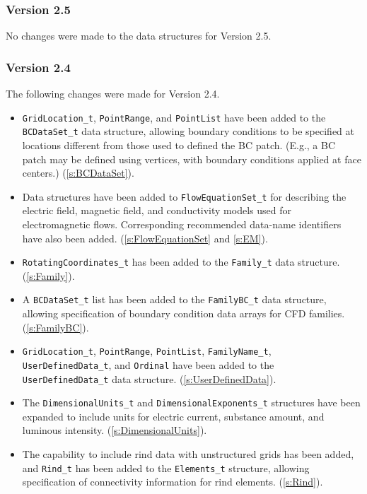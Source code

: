 \subsubsection{Version 2.5}
No changes were made to the data structures for Version 2.5.

\subsubsection{Version 2.4}
The following changes were made for Version 2.4.

\begin{itemize}
\item \texttt{GridLocation\_t}, \texttt{PointRange}, and \texttt{PointList}
      have been added to the \texttt{BCDataSet\_t} data structure,
      allowing boundary conditions to be specified at locations
      different from those used to defined the BC patch.
      (E.g., a BC patch may be defined using vertices, with boundary
      conditions applied at face centers.)
      (\autoref{s:BCDataSet}).
\item Data structures have been added to \texttt{FlowEquationSet\_t} for
      describing the electric field, magnetic field, and conductivity
      models used for electromagnetic flows.
      Corresponding recommended data-name identifiers have also been
      added.
      (\autoref{s:FlowEquationSet} and \autoref{s:EM}).
\item \texttt{RotatingCoordinates\_t} has been added to the
      \texttt{Family\_t} data structure.
      (\autoref{s:Family}).
\item A \texttt{BCDataSet\_t} list has been added to the
      \texttt{FamilyBC\_t} data structure, allowing specification of
      boundary condition data arrays for CFD families.
      (\autoref{s:FamilyBC}).
\item \texttt{GridLocation\_t}, \texttt{PointRange}, \texttt{PointList},
      \texttt{FamilyName\_t}, \texttt{UserDefinedData\_t}, and
      \texttt{Ordinal} have been added to the \texttt{UserDefinedData\_t}
      data structure.
      (\autoref{s:UserDefinedData}).
\item The \texttt{DimensionalUnits\_t} and \texttt{DimensionalExponents\_t}
      structures have been expanded to include units for electric
      current, substance amount, and luminous intensity.
      (\autoref{s:DimensionalUnits}).
\item The capability to include rind data with unstructured grids
      has been added, and \texttt{Rind\_t} has been added to the
      \texttt{Elements\_t} structure, allowing specification of
      connectivity information for rind elements.
      (\autoref{s:Rind}).
\end{itemize}


